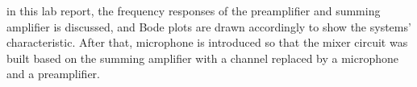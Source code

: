 in this lab report, the frequency responses of the preamplifier and summing amplifier is discussed, and Bode plots are drawn accordingly to show the systems' characteristic. After that, microphone is introduced so that the mixer circuit was built based on the summing amplifier with a channel replaced by a microphone and a preamplifier. 